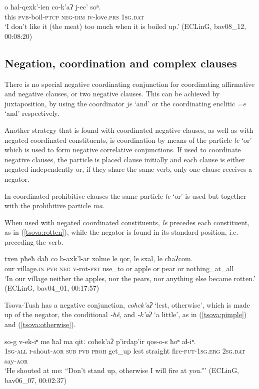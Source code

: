 \documentclass[output=paper,%
colorlinks,citecolor=brown,
showindex
]{langscibook}
\begin{document}
\ea	\label{tsova:meat}
\gll 	o ħal-qexk'-ien co-k'aʔ j-ec' soⁿ.\\
	this \textsc{pvb}-boil-\textsc{ptcp} \textsc{neg-dim} \textsc{iv}-love.\textsc{prs} \textsc{1sg.dat}\\
\glt `I don't like it (the meat) too much when it is boiled up.' (ECLinG, bav08\_12, 00:08:20)
\z 
   

\subsection{Negation, coordination  and complex clauses}
\label{tsova:coordination}
There is no special negative coordinating conjunction for coordinating affirmative and negative clauses, or two negative clauses. This can be achieved by juxtaposition, by using the coordinator \textit{je} `and' or the coordinating enclitic \textit{=e} `and' respectively.

Another strategy that is found with coordinated negative clauses, as well as with negated coordinated constituents, is coordination by means of the particle \textit{le} `or' which is used to form negative correlative conjunctions. If used to coordinate negative clauses, the particle is placed clause initially and each clause is either negated independently or, if they share the same verb, only one clause receives a negator. 

In coordinated prohibitive clauses the same particle \textit{le} `or' is used but together with the prohibitive particle \textit{ma}. 

When used with negated coordinated constituents, \textit{le} precedes each constituent, as in (\ref{tsova:rotten}), while the negator is found in its standard position, i.e. preceding the verb. 

\ea	\label{tsova:rotten}
\gll 	txen pħeħ daħ co b-axk'l-ar xolme le qor, le sxal, le cħaʔcom.\\  
	our village.\textsc{in} \textsc{pvb} \textsc{neg} \textsc{v}-rot-\textsc{pst} use\_to or apple or pear or nothing\_at\_all\\
\glt `In our village neither the apples, nor the pears, nor anything else became rotten.' (ECLinG, bav04\_01, 00:17:57)
\z

Tsova-Tush has a negative conjunction, \textit{coħek'aʔ} `lest, otherwise', which is made up of the negator, the conditional \textit{-ħĕ}, and \textit{-k'aʔ} `a little', as in (\ref{tsova:pimple}) and (\ref{tsova:otherwise}).

\ea	\label{tsova:otherwise}
\gll 	so-g v-ek-iⁿ me ħal ma qitː  coħek'aʔ p'irdap'ir qos-o-s ħoⁿ aɬ-iⁿ.\\  
	\textsc{1sg-all} \textsc{i}-shout-\textsc{aor} \textsc{sub} \textsc{pvb} \textsc{proh} get\_up lest straight fire-\textsc{fut}-\textsc{1sg.erg} \textsc{2sg.dat} say-\textsc{aor}\\
\glt `He shouted at me: ``Don't stand up, otherwise I will fire at you."' (ECLinG, bav06\_07, 00:02:37)
\z
\end{document}

